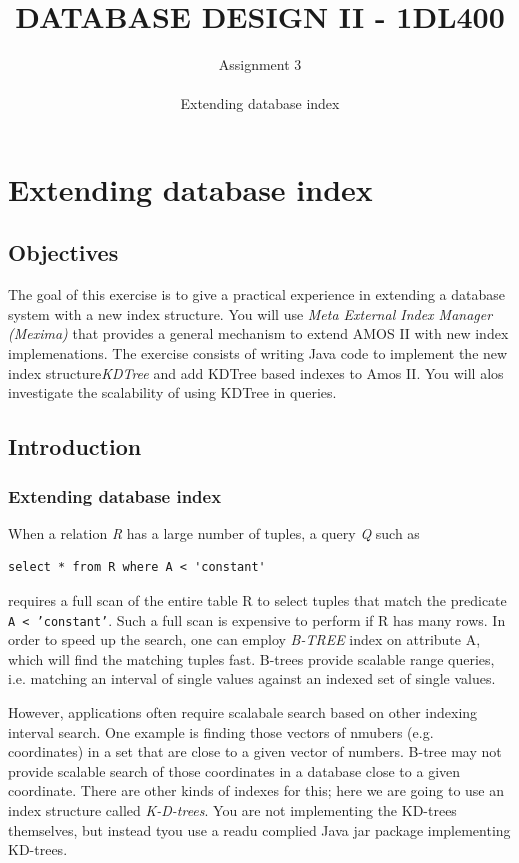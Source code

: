 \documentclass[12pt]{article}
\title{DATABASE DESIGN II - 1DL400}
\author{Assignment 3 \\ \\ Extending database index}
\date{}                                           %
\begin{document}
\maketitle


\section{Extending database index}

\subsection{Objectives}

The goal of this exercise is to give a practical experience in
extending a database system with a new index structure. You will use
\emph{Meta External Index Manager (Mexima)} that provides a
general mechanism to extend AMOS II with new index implemenations.
The exercise consists of writing Java code to implement the new index
structure\emph{KDTree} and add KDTree based indexes to Amos II. You
will alos investigate the scalability of using KDTree in queries.

\subsection{Introduction}
\subsubsection{Extending database index}
When a relation \emph{R} has a large number of tuples, a query
\emph{Q} such as
\begin{lstlisting}[caption=A general query to select tuples in a given range]
select * from R where A < 'constant'
\end{lstlisting}
requires a full scan of the entire table R to select tuples that match
the predicate \texttt{A < 'constant'}. Such a full scan is expensive
to perform if R has many rows. In order to speed up the search, one
can employ \emph{B-TREE} index on attribute A, which will find the
matching tuples fast. B-trees provide scalable range queries,
i.e. matching an interval of single values against an indexed set of
single values.

However, applications often require scalabale search based on other
indexing interval search. One example is finding those vectors of
nmubers (e.g. coordinates) in a set that are close to a given vector
of numbers. B-tree may not provide scalable search of those
coordinates in a database close to a given coordinate. There are other
kinds of indexes for this; here we are going to use an index structure
called {\em K-D-trees}. You are not implementing the KD-trees
themselves, but instead tyou use a readu complied Java jar package
implementing KD-trees.
\end{document}
